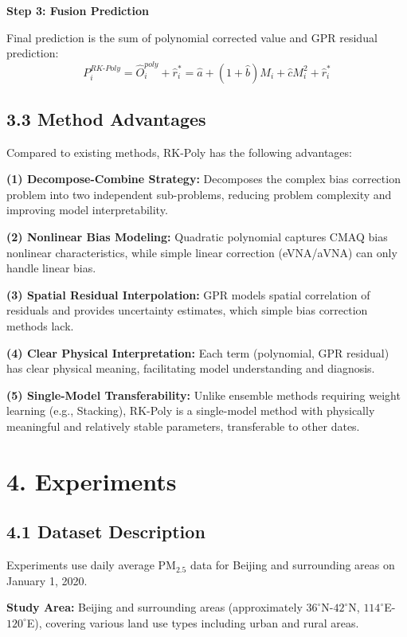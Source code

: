 \documentclass[a4paper]{article}
\begin{document}
\textbf{Step 3: Fusion Prediction}

Final prediction is the sum of polynomial corrected value and GPR residual prediction:
\begin{equation}
    P^{RK\text{-}Poly}_i = \hat{O}^{poly}_i + \hat{r}^*_i = \hat{a} + (1+\hat{b})M_i + \hat{c}M_i^2 + \hat{r}^*_i
    \label{eq:rkpoly_final}
\end{equation}

\subsection{3.3 Method Advantages}

Compared to existing methods, RK-Poly has the following advantages:

\textbf{(1) Decompose-Combine Strategy:} Decomposes the complex bias correction problem into two independent sub-problems, reducing problem complexity and improving model interpretability.

\textbf{(2) Nonlinear Bias Modeling:} Quadratic polynomial captures CMAQ bias nonlinear characteristics, while simple linear correction (eVNA/aVNA) can only handle linear bias.

\textbf{(3) Spatial Residual Interpolation:} GPR models spatial correlation of residuals and provides uncertainty estimates, which simple bias correction methods lack.

\textbf{(4) Clear Physical Interpretation:} Each term (polynomial, GPR residual) has clear physical meaning, facilitating model understanding and diagnosis.

\textbf{(5) Single-Model Transferability:} Unlike ensemble methods requiring weight learning (e.g., Stacking), RK-Poly is a single-model method with physically meaningful and relatively stable parameters, transferable to other dates.

\section{4. Experiments}

\subsection{4.1 Dataset Description}

Experiments use daily average PM$_{2.5}$ data for Beijing and surrounding areas on January 1, 2020.

\textbf{Study Area:} Beijing and surrounding areas (approximately $36^\circ$N-$42^\circ$N, $114^\circ$E-$120^\circ$E), covering various land use types including urban and rural areas.
\end{document}
